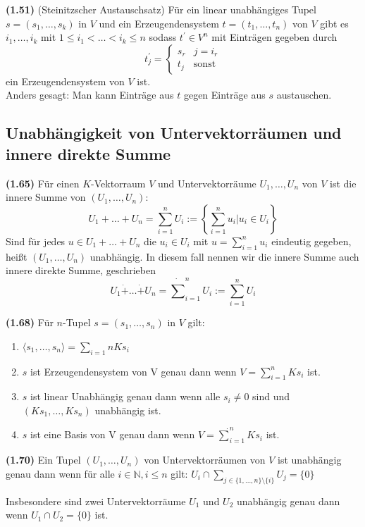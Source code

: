 \documentclass[11pt]{scrartcl}
\newlength{\hangwidth}
\newcommand{\skript}[1]{\settowidth{\hangwidth}{\textbf{(#1)} }\hangpara{\hangwidth}{1}\textbf{(#1)} }%
\begin{document}
\skript{1.51} (Steinitzscher Austauschsatz) Für ein linear unabhängiges Tupel $s = (s_1,\ldots,s_k)$ in $V$ und ein Erzeugendensystem $t=(t_1,\ldots,t_n)$ von $V$ gibt es $i_1,\ldots,i_k$ mit $1 \le i_1 < \ldots < i_k \le n$ sodass $t^\prime \in V^n$ mit Einträgen gegeben durch
$$t^\prime_j = \left\{\begin{array}{lr}
		s_r	&	j = i_r\\
		t_j	&	\text{sonst}
	\end{array}\right.$$
ein Erzeugendensystem von $V$ ist.\\
Anders gesagt: Man kann Einträge aus $t$ gegen Einträge aus $s$ austauschen.

\subsection{Unabhängigkeit von Untervektorräumen und innere direkte Summe}

\skript{1.65} Für einen $K$-Vektorraum $V$ und Untervektorräume $U_1,\ldots,U_n$ von $V$ ist die innere Summe von $(U_1,\ldots,U_n)$:
$$ U_1 + \ldots + U_n =  \sum_{i = 1}^n U_i := \left\{ \sum_{i=1}^n u_i \vert u_i \in U_i \right\}$$
Sind für jedes $u \in U_1 + \ldots + U_n$ die $u_i \in U_i$ mit $u = \sum_{i=1}^n u_i$ eindeutig gegeben, heißt $(U_1,\ldots,U_n)$ unabhängig. In diesem fall nennen wir die innere Summe auch innere direkte Summe, geschrieben
$$ U_1 \dot+ \ldots \dot+ U_n = \dot\sum_{i=1}^n U_i := \sum_{i=1}^n U_i$$

\skript{1.68} Für $n$-Tupel $s = (s_1,\ldots,s_n)$ in $V$ gilt:
\begin{enumerate}
	\item $\langle s_1,\ldots,s_n\rangle = \sum_{i=1}{n} Ks_i$
	\item $s$ ist Erzeugendensystem von V genau dann wenn $V = \sum_{i=1}^n Ks_i$ ist.
	\item $s$ ist linear Unabhängig genau dann wenn alle $s_i \neq 0$ sind und $(Ks_1,\ldots,Ks_n)$ unabhängig ist.
	\item $s$ ist eine Basis von V genau dann wenn $V = \dot\sum_{i=1}^n Ks_i$ ist.
\end{enumerate}

\skript{1.70} Ein Tupel $(U_1,\ldots,U_n)$ von Untervektorräumen von $V$ ist unabhängig genau dann wenn für alle $i \in \mathbb{N}, i \le n$ gilt: $U_i \cap \sum_{j \in \{1,\ldots,n\}\setminus\{i\}} U_j = \{0\}$

Insbesondere sind zwei Untervektorräume $U_1$ und $U_2$ unabhängig genau dann wenn $U_1 \cap U_2 = \{0\}$ ist.
\end{document}
